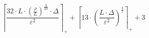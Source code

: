 \[\left\lceil \frac{32 \cdot L \cdot \left(\frac{\rho}{L}\right)^{\frac{3}{20}} \cdot \Delta}{\varepsilon^{2}} \right\rceil_{+} + \left\lceil 13 \cdot \left(\frac{L \cdot \Delta}{\varepsilon^{2}}\right)^{\frac{4}{5}} \right\rceil_{+} + 3\]
